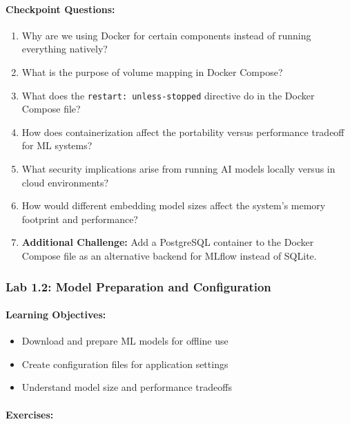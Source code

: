 \documentclass[
  screen,review,acmlarge]{acmart}
\newcommand{\passthrough}[1]{#1}
\providecommand{\tightlist}{%
  \setlength{\itemsep}{0pt}\setlength{\parskip}{0pt}}
\begin{document}
\paragraph{Checkpoint Questions:}\label{checkpoint-questions}

\begin{enumerate}
\def\labelenumi{\arabic{enumi}.}
\tightlist
\item
  Why are we using Docker for certain components instead of running everything natively?
\item
  What is the purpose of volume mapping in Docker Compose?
\item
  What does the \passthrough{\lstinline!restart: unless-stopped!} directive do in the Docker Compose file?
\item
  How does containerization affect the portability versus performance tradeoff for ML systems?
\item
  What security implications arise from running AI models locally versus in cloud environments?
\item
  How would different embedding model sizes affect the system's memory footprint and performance?
\item
  \textbf{Additional Challenge:} Add a PostgreSQL container to the Docker Compose file as an alternative backend for MLflow instead of SQLite.
\end{enumerate}

\subsubsection{Lab 1.2: Model Preparation and Configuration}\label{lab-1.2-model-preparation-and-configuration}

\paragraph{Learning Objectives:}\label{learning-objectives-1}

\begin{itemize}
\tightlist
\item
  Download and prepare ML models for offline use
\item
  Create configuration files for application settings
\item
  Understand model size and performance tradeoffs
\end{itemize}

\paragraph{Exercises:}\label{exercises}
\end{document}
